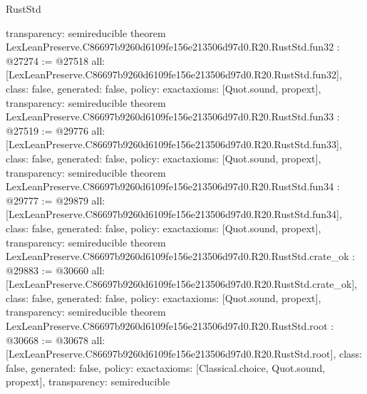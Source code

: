 \begin{lexlean}{RustStd}
\begin{coremodule}
{  transparency: semireducible
}
theorem LexLeanPreserve.C86697b9260d6109fe156e213506d97d0.R20.RustStd.fun32 : @27274 := @27518 {
  all: [LexLeanPreserve.C86697b9260d6109fe156e213506d97d0.R20.RustStd.fun32],
  class: false,
  generated: false,
  policy: exact{axioms: [Quot.sound, propext]},
  transparency: semireducible
}
theorem LexLeanPreserve.C86697b9260d6109fe156e213506d97d0.R20.RustStd.fun33 : @27519 := @29776 {
  all: [LexLeanPreserve.C86697b9260d6109fe156e213506d97d0.R20.RustStd.fun33],
  class: false,
  generated: false,
  policy: exact{axioms: [Quot.sound, propext]},
  transparency: semireducible
}
theorem LexLeanPreserve.C86697b9260d6109fe156e213506d97d0.R20.RustStd.fun34 : @29777 := @29879 {
  all: [LexLeanPreserve.C86697b9260d6109fe156e213506d97d0.R20.RustStd.fun34],
  class: false,
  generated: false,
  policy: exact{axioms: [Quot.sound, propext]},
  transparency: semireducible
}
theorem LexLeanPreserve.C86697b9260d6109fe156e213506d97d0.R20.RustStd.crate_ok : @29883 := @30660 {
  all: [LexLeanPreserve.C86697b9260d6109fe156e213506d97d0.R20.RustStd.crate_ok],
  class: false,
  generated: false,
  policy: exact{axioms: [Quot.sound, propext]},
  transparency: semireducible
}
theorem LexLeanPreserve.C86697b9260d6109fe156e213506d97d0.R20.RustStd.root : @30668 := @30678 {
  all: [LexLeanPreserve.C86697b9260d6109fe156e213506d97d0.R20.RustStd.root],
  class: false,
  generated: false,
  policy: exact{axioms: [Classical.choice, Quot.sound, propext]},
  transparency: semireducible
}


\end{coremodule}
\end{lexlean}
